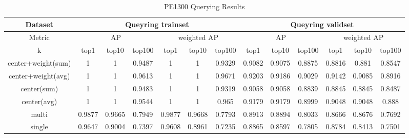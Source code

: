 \begin{table*}[!htb]%
\caption{PE1300 Querying Results}
\label{tab:pe_result}
\begin{minipage}{\textwidth}
\begin{center}
\begin{tabular}{|c|c|c|c|c|c|c|c|c|c|c|c|c|}
\hline
Dataset             & \multicolumn{6}{c|}{Queyring trainset}                      & \multicolumn{6}{c|}{Queyring validset}                      \\ \hline
Metric              & \multicolumn{3}{c|}{AP}  & \multicolumn{3}{c|}{weighted AP} & \multicolumn{3}{c|}{AP}  & \multicolumn{3}{c|}{weighted AP} \\ \hline
k              & top1   & top10  & top100 & top1      & top10     & top100   & top1   & top10  & top100 & top1      & top10     & top100   \\ \hline
center+weight(sum)  & 1      & 1      & 0.9487 & 1         & 1         & 0.9329   & 0.9082 & 0.9075 & 0.8875 & 0.8816    & 0.881     & 0.8547   \\ \hline
center+weight(avg) & 1      & 1      & 0.9613 & 1         & 1         & 0.9671   & 0.9203 & 0.9186 & 0.9029 & 0.9142    & 0.9085    & 0.8916   \\ \hline
center(sum)         & 1      & 1      & 0.9483 & 1         & 1         & 0.9319   & 0.9058 & 0.9058 & 0.8839 & 0.8845    & 0.8845    & 0.8487   \\ \hline
center(avg)        & 1      & 1      & 0.9544 & 1         & 1         & 0.965    & 0.9179 & 0.9179 & 0.8999 & 0.9048    & 0.9048    & 0.888    \\ \hline
multi               & 0.9877 & 0.9665 & 0.7949 & 0.9877    & 0.9668    & 0.7793   & 0.8913 & 0.8894 & 0.8033 & 0.8666    & 0.8676    & 0.7692   \\ \hline
single              & 0.9647 & 0.9004 & 0.7397 & 0.9608    & 0.8961    & 0.7235   & 0.8865 & 0.8597 & 0.7805 & 0.8784    & 0.8413    & 0.7501   \\ \hline
\end{tabular}
\end{center}
\bigskip\centering

\end{minipage}
\end{table*}%





